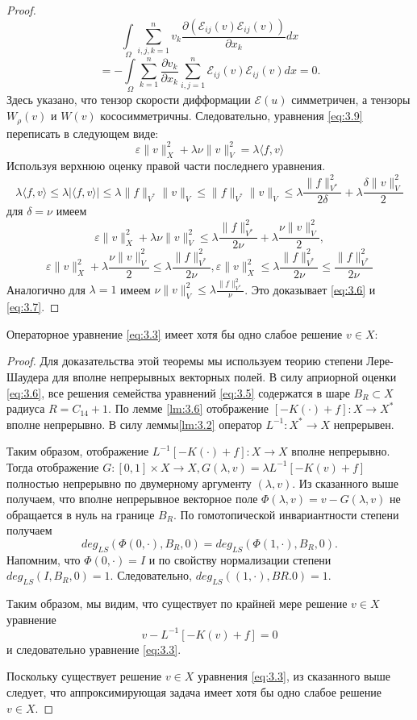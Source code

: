 \begin{proof}
$$\int\limits_{\Omega}\sum_{i,j,k=1}^n v_k\frac{\partial (\mathcal{E}_{ij}(v)\mathcal{E}_{ij}(v))}{\partial x_k}dx$$
$$=-\int\limits_{\Omega}\sum_{k=1}^n \frac{\partial v_k}{\partial x_k}\sum_{i,j=1}^n\mathcal{E}_{ij}(v)\mathcal{E}_{ij}(v)dx=0.$$
Здесь указано, что тензор скорости дифформации $\mathcal{E}(u)$ симметричен, а тензоры $W_{\rho}(v)$ и $W(v)$ кососимметричны. 
Следовательно, уравнения \ref{eq:3.9} переписать в следующем виде:
$$\varepsilon\|v\|^2_X+\lambda\nu\|v\|^2_V=\lambda\langle f,v\rangle$$
Используя верхнюю оценку правой части последнего уравнения.
$$\lambda\langle f,v\rangle\leqslant\lambda |\langle f,v\rangle|\leqslant\lambda\|f\|_{V^*}\|v\|_V\leqslant\|f\|_{V^*}\|v\|_V\leqslant
\lambda\frac{\|f\|_{V^*}^2}{2\delta}+\lambda\frac{\delta\|v\|_V^2}{2}$$
для $\delta=\nu$ имеем
$$\varepsilon\|v\|^2_X+\lambda\nu\|v\|^2_V\leqslant\lambda\frac{\|f\|^2_{V^*}}{2\nu}+\lambda\frac{\nu\|v\|^2_V}{2},$$
$$\varepsilon\|v\|^2_X+\lambda\frac{\nu\|v\|^2_V}{2}\leqslant\lambda\frac{\|f\|^2_{V^*}}{2\nu}, \varepsilon\|v\|^2_X\leqslant\lambda
\frac{\|f\|^2_{V^*}}{2\nu}\leqslant\frac{\|f\|^2_{V^*}}{2\nu}$$
Аналогично для $\lambda=1$ имеем $\nu\|v\|^2_V\leqslant\lambda\frac{\|f\|^2_{V^*}}{\nu}$. Это доказывает \ref{eq:3.6} и \ref{eq:3.7}.
\end{proof}

\begin{theorem}
    Операторное уравнение \ref{eq:3.3} имеет хотя бы одно слабое решение $v\in X:$
\end{theorem}

\begin{proof}
    Для доказательства этой теоремы мы используем теорию степени Лере-Шаудера для вполне непрерывных 
    векторных полей. В силу априорной оценки \ref{eq:3.6}, все решения семейства уравнений \ref{eq:3.5} содержатся в шаре 
    $B_R \subset X$ радиуса $R = C_{14} +1$. По лемме \ref{lm:3.6} отображение $[-K (\cdot) + f]: X \rightarrow X^*$
    вполне непрерывно. В силу леммы\ref{lm:3.2} оператор $L^{-1}: X^*\rightarrow X$ непрерывен.

    Таким образом, отображение $L^{-1}[-K (\cdot) + f]: X \rightarrow X$ вполне непрерывно.  
    Тогда отображение $G:[0, 1] \times X\rightarrow X, G (\lambda, v) = \lambda L^{-1}[- K (v) + f]$ 
    полностью непрерывно по двумерному аргументу $(\lambda, v)$.  Из сказанного выше получаем, что вполне непрерывное 
    векторное поле $\Phi(\lambda, v) = v - G (\lambda, v)$ не обращается в нуль на границе $B_R$. По гомотопической 
    инвариантности степени получаем
    $$deg_{LS}(\Phi(0,\cdot),B_R,0)=deg_{LS}(\Phi(1,\cdot),B_R,0).$$
    Напомним, что $\Phi(0,\cdot) = I$ и по свойству нормализации степени $deg_{LS} (I, B_R, 0) = 1$. 
    Следовательно, $deg_{LS} ((1,\cdot), BR.0) = 1$. 
    
    Таким образом, мы видим, что существует по крайней мере решение $v\in X$ уравнение
    $$v-L^{-1}[-K(v)+f]=0$$
    и следовательно уравнение \ref{eq:3.3}.

    Поскольку существует решение $v\in X$ уравнения \ref{eq:3.3}, из сказанного выше следует, 
    что аппроксимирующая задача имеет хотя бы одно слабое решение $v\in X$.
\end{proof}

